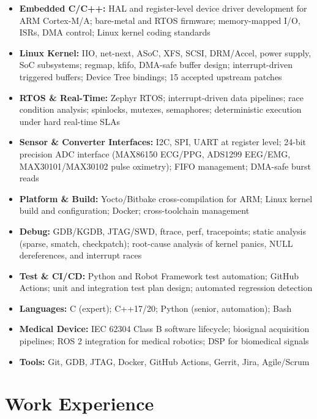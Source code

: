 \documentclass[10.5pt,a4paper]{article}
\begin{document}
\begin{itemize}
  \item \textbf{Embedded C/C++:} HAL and register-level device driver development for ARM Cortex-M/A; bare-metal and RTOS firmware; memory-mapped I/O, ISRs, DMA control; Linux kernel coding standards
  \item \textbf{Linux Kernel:} IIO, net-next, ASoC, XFS, SCSI, DRM/Accel, power supply, SoC subsystems; regmap, kfifo, DMA-safe buffer design; interrupt-driven triggered buffers; Device Tree bindings; 15 accepted upstream patches
  \item \textbf{RTOS \& Real-Time:} Zephyr RTOS; interrupt-driven data pipelines; race condition analysis; spinlocks, mutexes, semaphores; deterministic execution under hard real-time SLAs
  \item \textbf{Sensor \& Converter Interfaces:} I2C, SPI, UART at register level; 24-bit precision ADC interface (MAX86150 ECG/PPG, ADS1299 EEG/EMG, MAX30101/MAX30102 pulse oximetry); FIFO management; DMA-safe burst reads
  \item \textbf{Platform \& Build:} Yocto/Bitbake cross-compilation for ARM; Linux kernel build and configuration; Docker; cross-toolchain management
  \item \textbf{Debug:} GDB/KGDB, JTAG/SWD, ftrace, perf, tracepoints; static analysis (sparse, smatch, checkpatch); root-cause analysis of kernel panics, NULL dereferences, and interrupt races
  \item \textbf{Test \& CI/CD:} Python and Robot Framework test automation; GitHub Actions; unit and integration test plan design; automated regression detection
  \item \textbf{Languages:} C (expert); C++17/20; Python (senior, automation); Bash
  \item \textbf{Medical Device:} IEC 62304 Class B software lifecycle; biosignal acquisition pipelines; ROS 2 integration for medical robotics; DSP for biomedical signals
  \item \textbf{Tools:} Git, GDB, JTAG, Docker, GitHub Actions, Gerrit, Jira, Agile/Scrum
\end{itemize}

\section{Work Experience}
\end{document}
